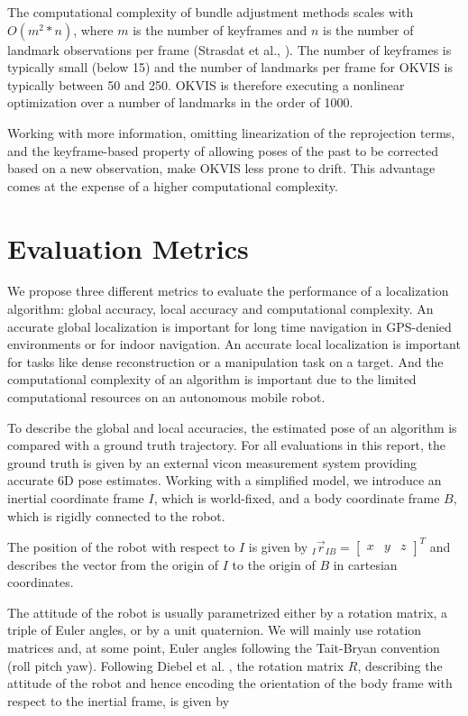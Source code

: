 The computational complexity of bundle adjustment methods scales with $O(m^2*n)$, where $m$ is the number of keyframes and $n$ is the number of landmark observations per frame (Strasdat et al., \cite{strasdat2010real}). The number of keyframes is typically small (below 15) and the number of landmarks per frame for OKVIS is typically between 50 and 250. OKVIS is therefore executing a nonlinear optimization over a number of landmarks in the order of 1000. 

Working with more information, omitting linearization of the reprojection terms, and the keyframe-based property of allowing poses of the past to be corrected based on a new observation, make OKVIS less prone to drift. This advantage comes at the expense of a higher computational complexity.



\section{Evaluation Metrics}
\label{sec:metrics}

We propose three different metrics to evaluate the performance of a localization algorithm: global accuracy, local accuracy and computational complexity. An accurate global localization is important for long time navigation in GPS-denied environments or for indoor navigation. An accurate local localization is important for tasks like dense reconstruction or a manipulation task on a target. And the computational complexity of an algorithm is important due to the limited computational resources on an autonomous mobile robot.

To describe the global and local accuracies, the estimated pose of an algorithm is compared with a ground truth trajectory. For all evaluations in this report, the ground truth is given by an external vicon measurement system providing accurate 6D pose estimates. Working with a simplified model, we introduce an inertial coordinate frame $I$, which is world-fixed, and a body coordinate frame $B$, which is rigidly connected to the robot. 

The position of the robot with respect to $I$ is given by $_I \vec{r}_{IB} = \left[ \begin{array}{ccc} x& y& z \end{array} \right]^T$ and describes the vector from the origin of $I$ to the origin of $B$ in cartesian coordinates. 

The attitude of the robot is usually parametrized either by a rotation matrix, a triple of Euler angles, or by a unit quaternion. We will mainly use rotation matrices and, at some point, Euler angles following the Tait-Bryan convention (roll pitch yaw). Following Diebel et al. \cite{diebel2006representing}, the rotation matrix $R$, describing the attitude of the robot and hence encoding the orientation of the body frame with respect to the inertial frame, is given by 

